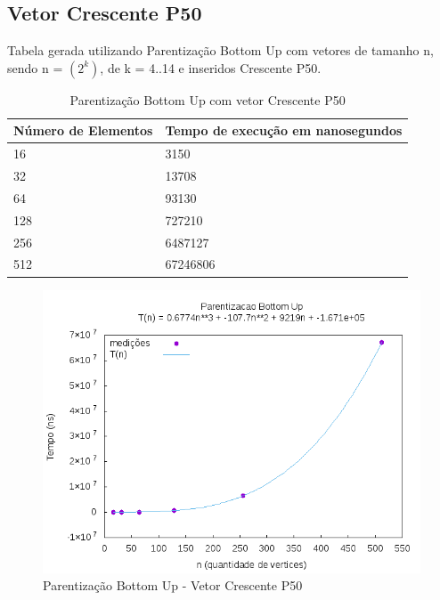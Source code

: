 \documentclass[12pt,a4paper,twoside]{report}
\begin{document}
\subsection{Vetor Crescente P50}
Tabela gerada utilizando Parentização Bottom Up com vetores de tamanho n, sendo n = $(2^k)$, de k = 4..14 e inseridos Crescente P50.
\begin{table}[H]
\centering
\caption{Parentização Bottom Up com vetor Crescente P50}
\label{my-label}
\begin{tabular}{|l|l|}
\hline
\multicolumn{1}{|c|}{\textbf{Número de Elementos}} & \multicolumn{1}{c|}{\textbf{Tempo de execução em nanosegundos}} \\ \hline
16 & 3150 \\ \hline
32 & 13708 \\ \hline
64 & 93130 \\ \hline
128 & 727210 \\ \hline
256 & 6487127 \\ \hline
512 & 67246806 \\ \hline
\end{tabular}
\end{table}

\begin{figure}[H]
    \centering
    \includegraphics[width=0.7\linewidth]{graficos/Parentizacao BottomUp/Crescente P50/ParentizacaoBottomUp.png}
  \caption{Parentização Bottom Up - Vetor Crescente P50}
\end{figure}
\end{document}
